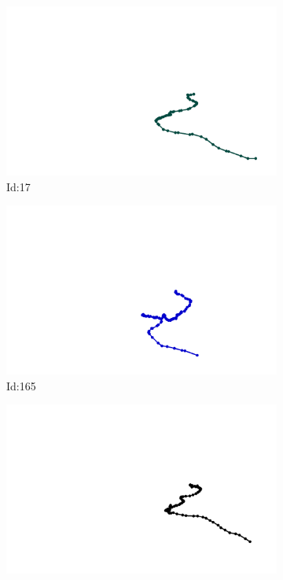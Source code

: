 \documentclass[12pt,twoside]{report}
\begin{document}
\begin{figure}
\centering
\begin{subfigure}[b]{0.20\textwidth}
\centering
\includegraphics[width=\textwidth]{../../trajectories/17.png}
\caption{Id:17}
\end{subfigure}
\begin{subfigure}[b]{0.20\textwidth}
\centering
\includegraphics[width=\textwidth]{../../trajectories/165.png}
\caption{Id:165}
\end{subfigure}
\begin{subfigure}[b]{0.20\textwidth}
\centering
\includegraphics[width=\textwidth]{../../trajectories/168.png}

\end{subfigure}
\end{figure}
\end{document}
